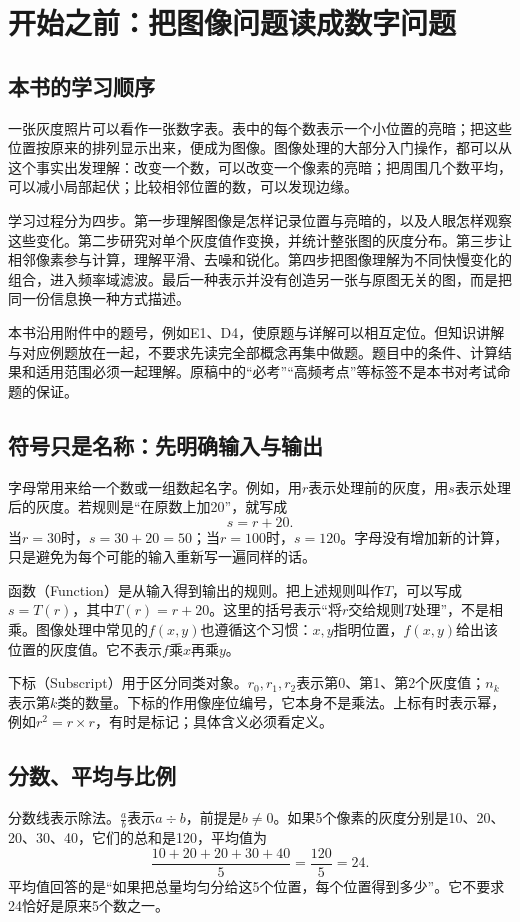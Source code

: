 \section{开始之前：把图像问题读成数字问题}
\subsection{本书的学习顺序}
一张灰度照片可以看作一张数字表。表中的每个数表示一个小位置的亮暗；把这些位置按原来的排列显示出来，便成为图像。图像处理的大部分入门操作，都可以从这个事实出发理解：改变一个数，可以改变一个像素的亮暗；把周围几个数平均，可以减小局部起伏；比较相邻位置的数，可以发现边缘。

学习过程分为四步。第一步理解图像是怎样记录位置与亮暗的，以及人眼怎样观察这些变化。第二步研究对单个灰度值作变换，并统计整张图的灰度分布。第三步让相邻像素参与计算，理解平滑、去噪和锐化。第四步把图像理解为不同快慢变化的组合，进入频率域滤波。最后一种表示并没有创造另一张与原图无关的图，而是把同一份信息换一种方式描述。

本书沿用附件中的题号，例如E1、D4，使原题与详解可以相互定位。但知识讲解与对应例题放在一起，不要求先读完全部概念再集中做题。题目中的条件、计算结果和适用范围必须一起理解。原稿中的“必考”“高频考点”等标签不是本书对考试命题的保证。

\subsection{符号只是名称：先明确输入与输出}
字母常用来给一个数或一组数起名字。例如，用$r$表示处理前的灰度，用$s$表示处理后的灰度。若规则是“在原数上加20”，就写成
\[
s=r+20.
\]
当$r=30$时，$s=30+20=50$；当$r=100$时，$s=120$。字母没有增加新的计算，只是避免为每个可能的输入重新写一遍同样的话。

函数（Function）是从输入得到输出的规则。把上述规则叫作$T$，可以写成$s=T(r)$，其中$T(r)=r+20$。这里的括号表示“将$r$交给规则$T$处理”，不是相乘。图像处理中常见的$f(x,y)$也遵循这个习惯：$x,y$指明位置，$f(x,y)$给出该位置的灰度值。它不表示$f$乘$x$再乘$y$。

下标（Subscript）用于区分同类对象。$r_0,r_1,r_2$表示第0、第1、第2个灰度值；$n_k$表示第$k$类的数量。下标的作用像座位编号，它本身不是乘法。上标有时表示幂，例如$r^2=r\times r$，有时是标记；具体含义必须看定义。

\subsection{分数、平均与比例}
分数线表示除法。$\frac{a}{b}$表示$a\div b$，前提是$b\ne0$。如果5个像素的灰度分别是10、20、20、30、40，它们的总和是120，平均值为
\[
\frac{10+20+20+30+40}{5}=\frac{120}{5}=24.
\]
平均值回答的是“如果把总量均匀分给这5个位置，每个位置得到多少”。它不要求24恰好是原来5个数之一。

